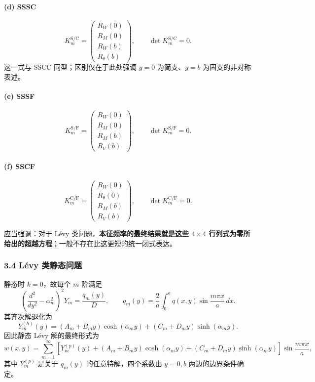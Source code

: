 \documentclass[12pt]{ctexart}
\begin{document}
\paragraph{(d) SSSC}
\[
K_m^{\text{S/C}}
=
\begin{pmatrix}
R_W(0)\\
R_M(0)\\
R_W(b)\\
R_\theta(b)
\end{pmatrix},
\qquad
\det K_m^{\text{S/C}}=0.
\]
这一式与 SSCC 同型；区别仅在于此处强调 \(y=0\) 为简支、\(y=b\) 为固支的非对称表述。

\paragraph{(e) SSSF}
\[
K_m^{\text{S/F}}
=
\begin{pmatrix}
R_W(0)\\
R_M(0)\\
R_M(b)\\
R_V(b)
\end{pmatrix},
\qquad
\det K_m^{\text{S/F}}=0.
\]

\paragraph{(f) SSCF}
\[
K_m^{\text{C/F}}
=
\begin{pmatrix}
R_W(0)\\
R_\theta(0)\\
R_M(b)\\
R_V(b)
\end{pmatrix},
\qquad
\det K_m^{\text{C/F}}=0.
\]

应当强调：对于 L\'evy 类问题，\textbf{本征频率的最终结果就是这些 \(4\times4\) 行列式为零所给出的超越方程}；一般不存在比这更短的统一闭式表达。

\subsubsection*{3.4 L\'evy 类静态问题}
静态时 \(k=0\)，故每个 \(m\) 阶满足
\[
\left(\frac{d^2}{dy^2}-\alpha_m^2\right)^2Y_m=\frac{q_m(y)}{D},
\qquad
q_m(y)=\frac{2}{a}\int_0^a q(x,y)\sin\frac{m\pi x}{a}\, dx.
\]
其齐次解退化为
\[
Y_m^{(h)}(y)
=
(A_m+B_my)\cosh(\alpha_my)+(C_m+D_my)\sinh(\alpha_my).
\]
因此静态 L\'evy 解的最终形式为
\[
w(x,y)=
\sum_{m=1}^\infty
\left[
Y_m^{(p)}(y)
+
(A_m+B_my)\cosh(\alpha_my)
+
(C_m+D_my)\sinh(\alpha_my)
\right]
\sin\frac{m\pi x}{a},
\]
其中 \(Y_m^{(p)}\) 是关于 \(q_m(y)\) 的任意特解，四个系数由 \(y=0,b\) 两边的边界条件确定。
\end{document}
